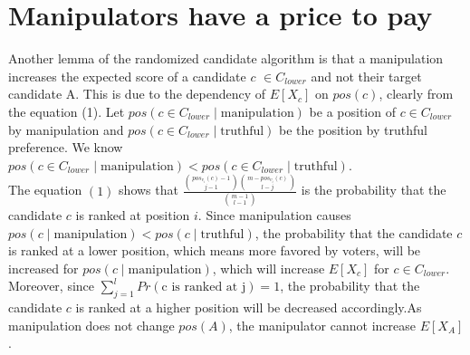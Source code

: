 \documentclass[letterpaper]{article} %
\begin{document}
\section{Manipulators have a price to pay}
Another lemma of the randomized candidate algorithm is that a manipulation increases the expected score of a candidate $c$ $\in C_{lower}$ and not their target candidate A. This is due to the dependency of $E[X_c]$ on $pos(c)$, clearly from the equation (1). Let $pos(c \in C_{lower} \mid \text{manipulation})$ be a position of $c \in C_{lower}$ by manipulation and $pos(c \in C_{lower}\mid \text{truthful})$ be the position by truthful preference. We know $pos(c \in C_{lower} \mid \text{manipulation}) < pos(c \in C_{lower}\mid \text{truthful})$. \\ %
The equation $(1)$ shows that $ \frac{\binom{pos_{v_i}(c)-1}{j-1}\binom{m-pos_{v_i}(c)}{l-j}}{\binom{m-1}{l-1}}$ is the probability that the candidate $c$ is ranked at position $i$. Since manipulation causes $pos(c \mid \text{manipulation}) < pos(c\mid \text{truthful})$, the probability that the candidate $c$ is ranked at a lower position, which means more favored by voters, will be increased for $pos(c \mid \text{manipulation})$, which will increase $E[X_c]$ for $c \in C_{lower}$. Moreover, since $\sum_{j=1}^l Pr(\text{c is ranked at j}) =1$,  the probability that the candidate $c$ is ranked at a higher position will be decreased accordingly.As manipulation does not change $pos(A)$, the manipulator cannot increase $E[X_A]$.
\end{document}
